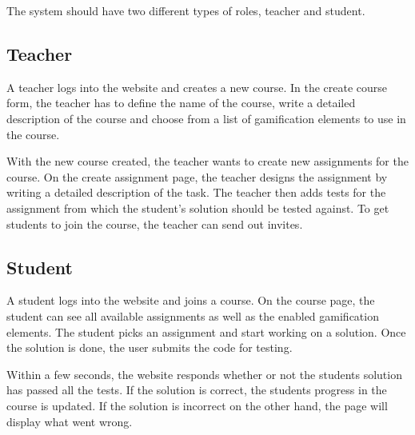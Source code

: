 The system should have two different types of roles, teacher and student.

\subsection{Teacher}
A teacher logs into the website and creates a new course. In the create course form, the teacher has to define the name of the course, write a detailed description of the course and choose from a list of gamification elements to use in the course. 

With the new course created, the teacher wants to create new assignments for the course. On the create assignment page, the teacher designs the assignment by writing a detailed description of the task. The teacher then adds tests for the assignment from which the student's solution should be tested against. To get students to join the course, the teacher can send out invites.

\subsection{Student}
A student logs into the website and joins a course. On the course page, the student can see all available assignments as well as the enabled gamification elements. The student picks an assignment and start working on a solution. Once the solution is done, the user submits the code for testing.

Within a few seconds, the website responds whether or not the students solution has passed all the tests. If the solution is correct, the students progress in the course is updated. If the solution is incorrect on the other hand, the page will display what went wrong.
